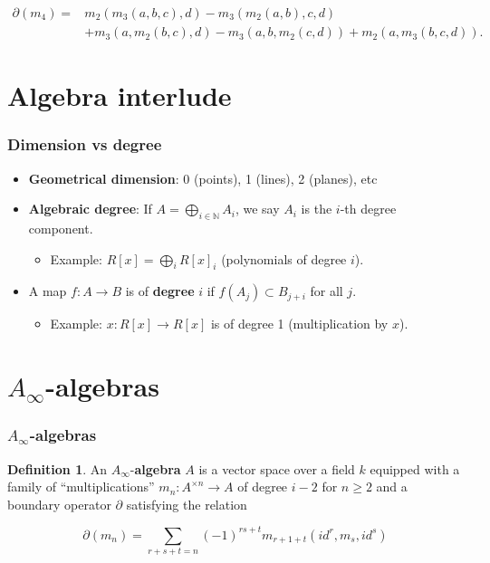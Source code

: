 \documentclass{beamer}
\theoremstyle{definition}
\newtheorem{defi}{Definition}
\begin{document}
\begin{frame}
 \begin{align*}
\partial(m_4)=&m_2(m_3(a,b,c), d)-m_3(m_2(a,b), c, d)\\
&+m_3(a, m_2(b,c), d)-m_3(a, b, m_2(c,d))+m_2(a, m_3(b,c,d)).
\end{align*}
\end{frame}
\section{Algebra interlude}
\begin{frame}
\frametitle{Dimension vs degree}

\begin{itemize}
\item<1-> \textbf{Geometrical dimension}: 0 (points), 1 (lines), 2 (planes), etc
\item<2-> \textbf{Algebraic degree}: If $A=\bigoplus_{i\in\mathbb{N}} A_i$, we say $A_i$ is the $i$-th degree component.
\begin{itemize}
\item<3-> Example: $R[x]=\bigoplus_i R[x]_i$ (polynomials of degree $i$).
\end{itemize}
\item<4-> A map $f:A\to B$ is of \textbf{degree} $i$ if $f(A_j)\subset B_{j+i}$ for all $j$.
\begin{itemize}
\item<5-> Example: $x:R[x]\to R[x]$ is of degree 1 (multiplication by $x$).
\end{itemize}
\end{itemize}
\end{frame}

\section{$A_\infty$-algebras}
\begin{frame}
\frametitle{$A_\infty$-algebras}
\begin{defi}
An $A_\infty$-\textbf{algebra} $A$ is a vector space over a field $k$ equipped with a family of ``multiplications'' $m_n:A^{\times n}\to A$ of degree $i-2$ for $n\geq 2$ and a boundary operator $\partial$ satisfying the relation

\[\partial(m_n)=\sum_{r+s+t=n}(-1)^{rs+t}m_{r+1+t}(id^{ r}, m_s, id^{ s})\] %
\end{defi}

\end{frame}
\end{document}
